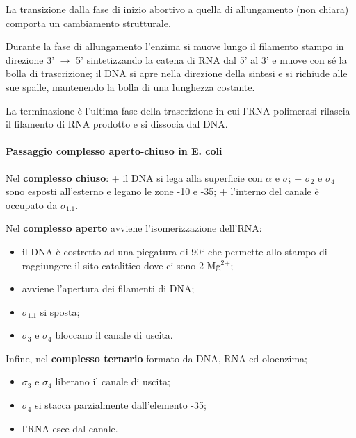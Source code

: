 \documentclass[11pt]{book}
\begin{document}
La transizione dalla fase di inizio abortivo a quella di allungamento
(non chiara) comporta un cambiamento strutturale.

Durante la fase di allungamento l'enzima si muove lungo il filamento
stampo in direzione 3' \(\rightarrow\) 5' sintetizzando la catena di RNA
dal 5' al 3' e muove con sé la bolla di trascrizione; il DNA si apre
nella direzione della sintesi e si richiude alle sue spalle, mantenendo
la bolla di una lunghezza costante.

La terminazione è l'ultima fase della trascrizione in cui l'RNA
polimerasi rilascia il filamento di RNA prodotto e si dissocia dal DNA.

\paragraph{Passaggio complesso aperto-chiuso in E.
coli}\label{passaggio-complesso-aperto-chiuso-in-e.-coli}

Nel \textbf{complesso chiuso}: + il DNA si lega alla superficie con
\(\alpha\) e \(\sigma\); + \(\sigma\)\(_2\) e \(\sigma\)\(_4\) sono
esposti all'esterno e legano le zone -10 e -35; + l'interno del canale è
occupato da \(\sigma\)\(_1.1\).

Nel \textbf{complesso aperto} avviene l'isomerizzazione dell'RNA:

\begin{itemize}
\itemsep1pt\parskip0pt
\item
  il DNA è costretto ad una piegatura di 90° che permette allo stampo di
  raggiungere il sito catalitico dove ci sono 2 Mg\(^2\)\(^+\);
\item
  avviene l'apertura dei filamenti di DNA;
\item
  \(\sigma\)\(_1.1\) si sposta;
\item
  \(\sigma\)\(_3\) e \(\sigma\)\(_4\) bloccano il canale di uscita.
\end{itemize}

Infine, nel \textbf{complesso ternario} formato da DNA, RNA ed
oloenzima;

\begin{itemize}
\itemsep1pt\parskip0pt
\item
  \(\sigma\)\(_3\) e \(\sigma\)\(_4\) liberano il canale di uscita;
\item
  \(\sigma\)\(_4\) si stacca parzialmente dall'elemento -35;
\item
  l'RNA esce dal canale.
\end{itemize}
\end{document}
